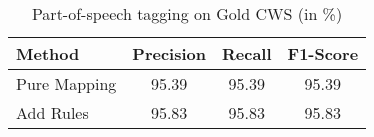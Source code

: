 \begin{table}[htbp!]
    \centering
    \begin{tabular}{lccc}
    \toprule
        Method         & Precision     & Recall   & F1-Score \\
    \midrule
        Pure Mapping   & 95.39         & 95.39    & 95.39    \\
        Add Rules      & 95.83         & 95.83    & 95.83    \\
    \bottomrule
    \end{tabular}
\caption{Part-of-speech tagging on Gold CWS (in \%)}
\label{tab:pos_on_gold_cws}
\end{table}